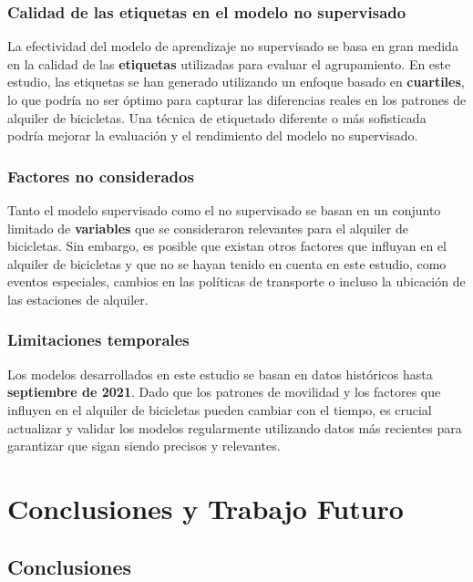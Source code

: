 \documentclass{wsdcr}
\begin{document}
\subsubsection{Calidad de las etiquetas en el modelo no supervisado}

La efectividad del modelo de aprendizaje no supervisado se basa en gran medida en la calidad de las \textbf{etiquetas} utilizadas para evaluar el agrupamiento. En este estudio, las etiquetas se han generado utilizando un enfoque basado en \textbf{cuartiles}, lo que podría no ser óptimo para capturar las diferencias reales en los patrones de alquiler de bicicletas. Una técnica de etiquetado diferente o más sofisticada podría mejorar la evaluación y el rendimiento del modelo no supervisado.

\subsubsection{Factores no considerados}

Tanto el modelo supervisado como el no supervisado se basan en un conjunto limitado de \textbf{variables} que se consideraron relevantes para el alquiler de bicicletas. Sin embargo, es posible que existan otros factores que influyan en el alquiler de bicicletas y que no se hayan tenido en cuenta en este estudio, como eventos especiales, cambios en las políticas de transporte o incluso la ubicación de las estaciones de alquiler.

\subsubsection{Limitaciones temporales}

Los modelos desarrollados en este estudio se basan en datos históricos hasta \textbf{septiembre de 2021}. Dado que los patrones de movilidad y los factores que influyen en el alquiler de bicicletas pueden cambiar con el tiempo, es crucial actualizar y validar los modelos regularmente utilizando datos más recientes para garantizar que sigan siendo precisos y relevantes.

\section{Conclusiones y Trabajo Futuro}

\subsection{Conclusiones}
\end{document}
